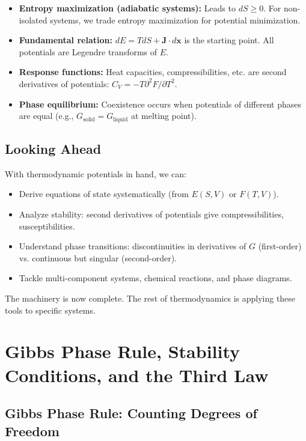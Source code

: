 \documentclass[9pt,twocoloumn]{article}
\begin{document}
\begin{itemize}
    \item \textbf{Entropy maximization (adiabatic systems):} Leads to $dS \geq 0$. For non-isolated systems, we trade entropy maximization for potential minimization.

    \item \textbf{Fundamental relation:} $dE = T dS + \mathbf{J} \cdot d\mathbf{x}$ is the starting point. All potentials are Legendre transforms of $E$.

    \item \textbf{Response functions:} Heat capacities, compressibilities, etc. are second derivatives of potentials: $C_V = -T \partial^2 F/\partial T^2$.

    \item \textbf{Phase equilibrium:} Coexistence occurs when potentials of different phases are equal (e.g., $G_{\text{solid}} = G_{\text{liquid}}$ at melting point).
\end{itemize}

\subsection{Looking Ahead}

With thermodynamic potentials in hand, we can:
\begin{itemize}
    \item Derive equations of state systematically (from $E(S, V)$ or $F(T, V)$).
    \item Analyze stability: second derivatives of potentials give compressibilities, susceptibilities.
    \item Understand phase transitions: discontinuities in derivatives of $G$ (first-order) vs. continuous but singular (second-order).
    \item Tackle multi-component systems, chemical reactions, and phase diagrams.
\end{itemize}

The machinery is now complete. The rest of thermodynamics is applying these tools to specific systems.

\section{Gibbs Phase Rule, Stability Conditions, and the Third Law}

\subsection{Gibbs Phase Rule: Counting Degrees of Freedom}
\end{document}
